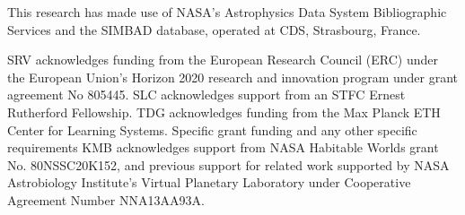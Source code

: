 \documentclass[
    usenatbib,
]{mnras}
\begin{document}
This research has made use of NASA's Astrophysics Data System Bibliographic Services and the SIMBAD database, operated at CDS, Strasbourg, France. 

SRV acknowledges funding from the European Research Council (ERC) under the European Union’s Horizon 2020 research and innovation program under grant agreement No 805445.
SLC acknowledges support from an STFC Ernest Rutherford Fellowship. 
TDG acknowledges funding from the Max Planck ETH Center for Learning Systems.
Specific grant funding and any other specific requirements
KMB acknowledges support from NASA Habitable
Worlds grant No. 80NSSC20K152, and previous support for related work supported by NASA Astrobiology Institute's Virtual Planetary Laboratory under Cooperative Agreement Number NNA13AA93A.



\end{document}
